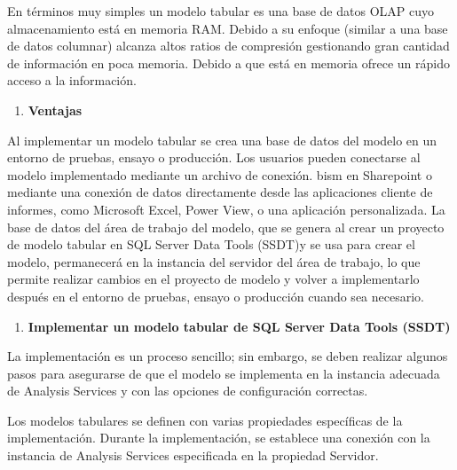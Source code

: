 \documentclass{article} %
\begin{document}
\noindent En t\'{e}rminos muy simples un modelo tabular es una base de datos OLAP cuyo almacenamiento est\'{a} en memoria RAM. Debido a su enfoque (similar a una base de datos columnar) alcanza altos ratios de compresi\'{o}n gestionando gran cantidad de informaci\'{o}n en poca memoria. Debido a que est\'{a} en memoria ofrece un r\'{a}pido acceso a la informaci\'{o}n.

\noindent 

\begin{enumerate}
\item  \textbf{Ventajas}
\end{enumerate}

\noindent Al implementar un modelo tabular se crea una base de datos del modelo en un entorno de pruebas, ensayo o producci\'{o}n. Los usuarios pueden conectarse al modelo implementado mediante un archivo de conexi\'{o}n. bism en Sharepoint o mediante una conexi\'{o}n de datos directamente desde las aplicaciones cliente de informes, como Microsoft Excel, Power View, o una aplicaci\'{o}n personalizada. La base de datos del \'{a}rea de trabajo del modelo, que se genera al crear un proyecto de modelo tabular en SQL Server Data Tools (SSDT)y se usa para crear el modelo, permanecer\'{a} en la instancia del servidor del \'{a}rea de trabajo, lo que permite realizar cambios en el proyecto de modelo y volver a implementarlo despu\'{e}s en el entorno de pruebas, ensayo o producci\'{o}n cuando sea necesario.

\noindent 

\begin{enumerate}
\item  \textbf{Implementar un modelo tabular de SQL Server Data Tools (SSDT)}
\end{enumerate}

\noindent \textbf{}

\noindent La implementaci\'{o}n es un proceso sencillo; sin embargo, se deben realizar algunos pasos para asegurarse de que el modelo se implementa en la instancia adecuada de Analysis Services y con las opciones de configuraci\'{o}n correctas.

\noindent 

\noindent Los modelos tabulares se definen con varias propiedades espec\'{i}ficas de la implementaci\'{o}n. Durante la implementaci\'{o}n, se establece una conexi\'{o}n con la instancia de Analysis Services especificada en la propiedad Servidor. 

\noindent 
\end{document}

